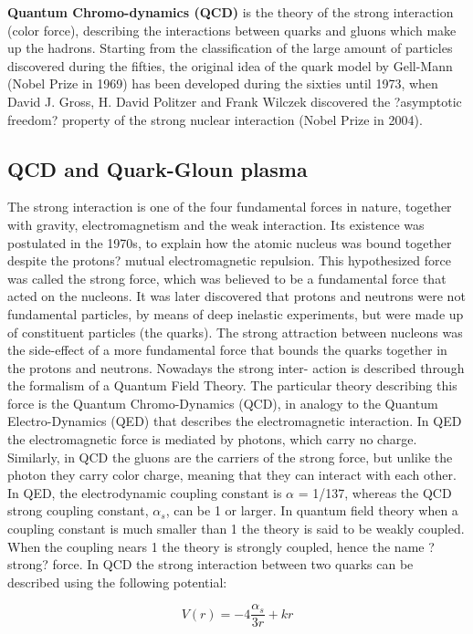 \textbf{Quantum Chromo-dynamics (QCD)} is the theory of the strong interaction (color force), describing the interactions between quarks and gluons which make up the hadrons. Starting from the classification of the large amount of particles discovered during the fifties, the original idea of the quark model by Gell-Mann (Nobel Prize in 1969) has been developed during the sixties until 1973, when David J. Gross, H. David Politzer and Frank Wilczek discovered the ?asymptotic freedom? property of the strong nuclear interaction (Nobel Prize in 2004).

\subsection{QCD and Quark-Gloun plasma}
The strong interaction is one of the four fundamental forces in nature, together with gravity, electromagnetism and the weak interaction. Its existence was postulated in the 1970s, to explain how the atomic nucleus was bound together despite the protons? mutual electromagnetic repulsion. This hypothesized force was called the strong force, which was believed to be a fundamental force that acted on the nucleons. It was later discovered that protons and neutrons were not fundamental particles, by means of deep inelastic experiments, but were made up of constituent particles (the quarks). The strong attraction between nucleons was the side-effect of a more fundamental force that bounds the quarks together in the protons and neutrons. Nowadays the strong inter- action is described through the formalism of a Quantum Field Theory. The particular theory describing this force is the Quantum Chromo-Dynamics (QCD), in analogy to the Quantum Electro-Dynamics (QED) that describes the electromagnetic interaction. In QED the electromagnetic force is mediated by photons, which carry no charge. Similarly, in QCD the gluons are the carriers of the strong force, but unlike the photon they carry color charge, meaning that they can interact with each other. In QED, the electrodynamic coupling constant is $\alpha$ = 1/137, whereas the QCD strong coupling constant, $\alpha_{s}$, can be 1 or larger. In quantum field theory when a coupling constant is much smaller than 1 the theory is said to be weakly coupled. When the coupling nears 1 the theory is strongly coupled, hence the name ?strong? force.
In QCD the strong interaction between two quarks can be described using the following potential:

\begin{equation}\label{label:potential}
V(r) = -4\frac{\alpha_{s}}{3r} + kr
\end{equation}

